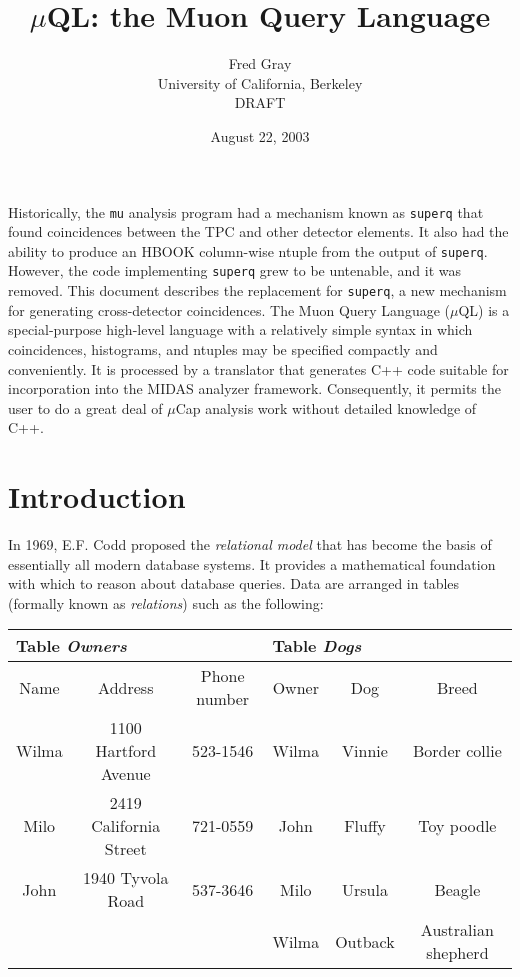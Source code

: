 \documentclass[12pt]{article}
\begin{document}
\title{$\mu$QL: the Muon Query Language}
\author{Fred Gray \\ University of California, Berkeley \\ DRAFT}
\date{August 22, 2003}
\maketitle

Historically, the {\tt mu} analysis program had a mechanism known as
{\tt superq} that found coincidences between the TPC and other detector
elements.  It also had the ability to produce an HBOOK column-wise ntuple 
from the output of {\tt superq}.  However, the code implementing {\tt superq} 
grew to be untenable, and it was removed.  
This document describes the replacement for {\tt superq}, a new mechanism 
for generating cross-detector coincidences.  The Muon Query Language ($\mu$QL) 
is a special-purpose high-level language with a relatively simple syntax 
in which coincidences, histograms, and ntuples may be specified compactly and 
conveniently.  It is processed by a translator that generates C++ code 
suitable for incorporation into the MIDAS analyzer framework.  Consequently, 
it permits the user to do a great deal of $\mu$Cap analysis work without 
detailed knowledge of C++.

\section{Introduction}

In 1969, E.F. Codd proposed the {\em relational model} that has become 
the basis of essentially all modern database systems.  It provides a 
mathematical foundation with which to reason about database queries.  Data are 
arranged in tables (formally known as {\em relations}) such as the following:

\vspace{5mm}
\begin{tabular}{|c|c|c||c|c|c|}
\multicolumn{3}{l}{Table {\em Owners}} & \multicolumn{3}{l}{Table {\em Dogs}} \\
\hline
Name & Address & Phone number & Owner & Dog & Breed \\
\hline
Wilma & 1100 Hartford Avenue & 523-1546 & Wilma & Vinnie & Border collie \\
Milo & 2419 California Street  & 721-0559 & John & Fluffy & Toy poodle \\
John & 1940 Tyvola Road & 537-3646 & Milo & Ursula & Beagle \\
 & & & Wilma & Outback & Australian shepherd \\
\hline
\end{tabular}
\vspace{5mm}
\end{document}
